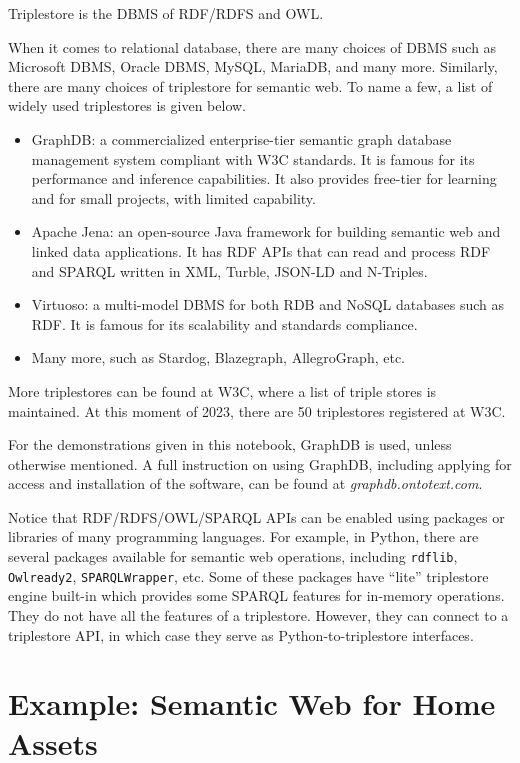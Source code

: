Triplestore is the DBMS of RDF/RDFS and OWL. 

When it comes to relational database, there are many choices of DBMS such as Microsoft DBMS, Oracle DBMS, MySQL, MariaDB, and many more. Similarly, there are many choices of triplestore for semantic web. To name a few, a list of widely used triplestores is given below.
\begin{itemize}
	\item GraphDB: a commercialized enterprise-tier semantic graph database management system compliant with W3C standards. It is famous for its performance and inference capabilities. It also provides free-tier for learning and for small projects, with limited capability.
	\item Apache Jena: an open-source Java framework for building semantic web and linked data applications. It has RDF APIs that can read and process RDF and SPARQL written in XML, Turble, JSON-LD and N-Triples.
	\item Virtuoso: a multi-model DBMS for both RDB and NoSQL databases such as RDF. It is famous for its scalability and standards compliance.
	\item Many more, such as Stardog, Blazegraph, AllegroGraph, etc.
\end{itemize}

More triplestores can be found at W3C, where a list of triple stores is maintained. At this moment of 2023, there are 50 triplestores registered at W3C.

For the demonstrations given in this notebook, GraphDB is used, unless otherwise mentioned. A full instruction on using GraphDB, including applying for access and installation of the software, can be found at \textit{graphdb.ontotext.com}.

Notice that RDF/RDFS/OWL/SPARQL APIs can be enabled using packages or libraries of many programming languages. For example, in Python, there are several packages available for semantic web operations, including \verb|rdflib|, \verb|Owlready2|, \verb|SPARQLWrapper|, etc. Some of these packages have ``lite'' triplestore engine built-in which provides some SPARQL features for in-memory operations. They do not have all the features of a triplestore. However, they can connect to a triplestore API, in which case they serve as Python-to-triplestore interfaces.


\section{Example: Semantic Web for Home Assets}

